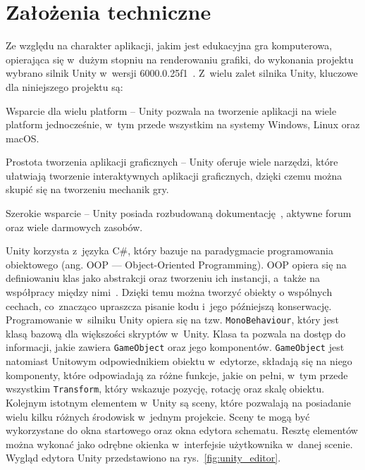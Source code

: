 \section{Założenia techniczne}
\label{sec:zalozenia_techniczne}

Ze względu na charakter aplikacji, jakim jest edukacyjna gra komputerowa,
opierająca się w~dużym stopniu na renderowaniu grafiki,
do wykonania projektu wybrano silnik Unity w~wersji 6000.0.25f1~\cite{unity_site}.
Z~wielu zalet silnika Unity, kluczowe dla niniejszego projektu są:

\begin{citemize}
    \item Wsparcie dla wielu platform --
    Unity pozwala na tworzenie aplikacji na wiele platform jednocześnie, w~tym przede wszystkim na systemy Windows, Linux oraz macOS.
    \item Prostota tworzenia aplikacji graficznych --
    Unity oferuje wiele narzędzi, które ułatwiają tworzenie interaktywnych aplikacji graficznych,
    dzięki czemu można skupić się na tworzeniu mechanik gry.
    \item Szerokie wsparcie --
    Unity posiada rozbudowaną dokumentację~\cite{unity_docs},
    aktywne forum~\cite{unity_forum} oraz wiele darmowych zasobów.
\end{citemize}

Unity korzysta z~języka C\#,
który bazuje na paradygmacie programowania obiektowego (ang. OOP — Object-Oriented Programming).
OOP opiera się na definiowaniu klas jako abstrakcji oraz tworzeniu ich instancji,
a~także na współpracy między nimi~\cite{nygaard1986basic}.
Dzięki temu można tworzyć obiekty o wspólnych cechach,
co~znacząco upraszcza pisanie kodu i~jego późniejszą konserwację.\\
\indent Programowanie w~silniku Unity opiera się na tzw. \texttt{MonoBehaviour},
który jest klasą bazową dla większości skryptów w~Unity.
Klasa ta pozwala na dostęp do informacji, jakie zawiera \texttt{GameObject} oraz jego komponentów.
\texttt{GameObject} jest natomiast Unitowym odpowiednikiem obiektu w~edytorze,
składają się na niego komponenty, które odpowiadają za różne funkcje, jakie on pełni,
w~tym przede wszystkim \texttt{Transform}, który wskazuje pozycję, rotację oraz skalę obiektu.\\
\indent Kolejnym istotnym elementem w~Unity są sceny,
które pozwalają na posiadanie wielu kilku różnych środowisk w~jednym projekcie.
Sceny te mogą być wykorzystane do okna startowego oraz okna edytora schematu.
Resztę elementów można wykonać jako odrębne okienka w~interfejsie użytkownika w~danej scenie.
Wygląd edytora Unity przedstawiono na rys.~\ref{fig:unity_editor}.

